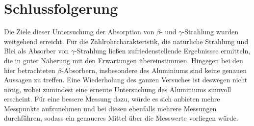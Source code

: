 \section{Schlussfolgerung}
	
	Die Ziele dieser Untersuchung der Absorption von $\beta$- und $\gamma$-Strahlung wurden weitgehend erreicht.
	Für die Zählrohrcharakteristik, die natürliche Strahlung und Blei als Absorber von $\gamma$-Strahlung ließen zufriedenstellende Ergebnissee ermitteln, die in guter Näherung mit den Erwartungen übereinstimmen.
	Hingegen bei den hier betrachteten $\beta$-Absorbern, insbesondere des Aluminiums sind keine genauen Aussagen zu treffen.
	Eine Wiederholung des ganzen Versuches ist deswegen nicht nötig, wobei zumindest eine erneute Untersuchung des Aluminiums sinnvoll erscheint.
	Für eine bessere Messung dazu, würde es sich anbieten mehre Messpunkte aufzunehmen und bei diesen ebenfalls mehrere Messungen durchführen, sodass ein genaueres Mittel über die Messwerte vorliegen würde.
	
	